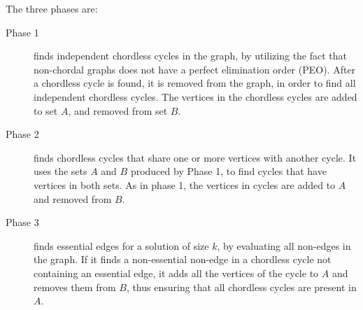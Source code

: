 \documentclass{article}
\begin{document}
		The three phases are:
		\begin{description}
			\item[Phase 1] finds independent chordless cycles in the graph, by utilizing the fact that non-chordal graphs does not have a perfect elimination order (PEO). After a chordless cycle is found, it is removed from the graph, in order to find all independent chordless cycles. The vertices in the chordless cycles are added to set $A$, and removed from set $B$.
			\item[Phase 2] finds chordless cycles that share one or more vertices with another cycle. It uses the sets $A$ and $B$ produced by Phase 1, to find cycles that have vertices in both sets. As in phase 1, the vertices in cycles are added to $A$ and removed from $B$.
			\item[Phase 3] finds essential edges for a solution of size $k$, by evaluating all non-edges in the graph. If it finds a non-essential non-edge in a chordless cycle not containing an essential edge, it adds all the vertices of the cycle to $A$ and removes them from $B$, thus ensuring that all chordless cycles are present in $A$.
		\end{description}
\end{document}
